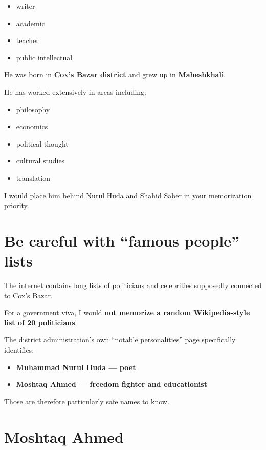 \begin{itemize}
  \item writer
  \item academic
  \item teacher
  \item public intellectual
\end{itemize}

He was born in \textbf{Cox's Bazar district} and grew up in \textbf{Maheshkhali}.

He has worked extensively in areas including:

\begin{itemize}
  \item philosophy
  \item economics
  \item political thought
  \item cultural studies
  \item translation
\end{itemize}

I would place him behind Nurul Huda and Shahid Saber in your memorization priority.

\medskip

\section{Be careful with ``famous people'' lists}

The internet contains long lists of politicians and celebrities supposedly connected to Cox's Bazar.

For a government viva, I would \textbf{not memorize a random Wikipedia-style list of 20 politicians}.

The district administration's own ``notable personalities'' page specifically identifies:

\begin{itemize}
  \item \textbf{Muhammad Nurul Huda --- poet}
  \item \textbf{Moshtaq Ahmed --- freedom fighter and educationist}
\end{itemize}



Those are therefore particularly safe names to know.

\medskip

\section{Moshtaq Ahmed}

